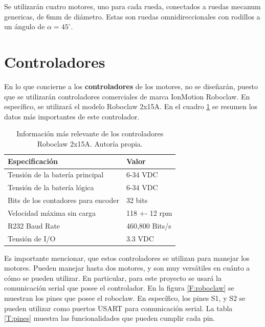 Se utilizarán cuatro motores, uno para cada rueda, conectados a ruedas mecanum genericas, de 6mm de diámetro. Estas son ruedas omnidireccionales con rodillos a un ángulo de $\alpha = 45^\circ$.

\section{Controladores}

En lo que concierne a los \textbf{controladores} de los motores, no se diseñarán, puesto que se utilizarán controladores comerciales de marca IonMotion Roboclaw. En específico, se utilizará el modelo Roboclaw 2x15A. En el cuadro \ref{T:roboclaw} se resumen los datos más importantes de este controlador.

\begin{table}[H]
\caption{Información más relevante de los controladores Roboclaw 2x15A. Autoría propia.}
\begin{tabular}{|l|l|}
\hline
Especificación                      & Valor          \\ \hline
Tensión de la batería principal     & 6-34 VDC       \\ \hline
Tensión de la batería lógica        & 6-34 VDC       \\ \hline
Bits de los contadores para encoder & 32 bits        \\ \hline
Velocidad máxima sin carga          & 118 +- 12 rpm  \\ \hline
R232 Baud Rate                      & 460,800 Bits/s \\ \hline
Tensión de I/O                      & 3.3 VDC        \\ \hline
\end{tabular}
\label{T:roboclaw}
\end{table}

Es importante mencionar, que estos controladores se utilizan para manejar los motores. Pueden manejar hasta dos motores, y son muy versátiles en cuánto a cómo se pueden utilizar. En particular, para este proyecto se usará la comunicación serial que posee el controlador. En la figura \ref{F:roboclaw} se muestran los pines que posee el roboclaw. En específico, los pines S1, y S2 se pueden utilizar como puertos USART para comunicación serial. La tabla \ref{T:pines} muestra las funcionalidades que pueden cumplir cada pin.

